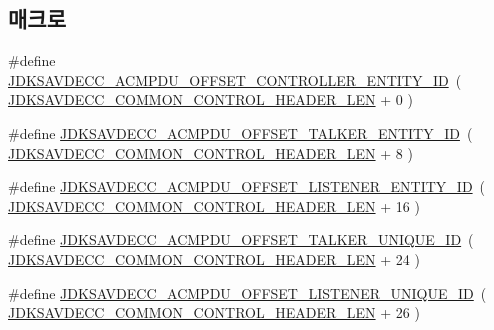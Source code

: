 \subsection*{매크로}
\begin{DoxyCompactItemize}
\item 
\#define \hyperlink{group__acmpdu_gaa909d408c6f67c983cb996f1a7bccf71}{J\+D\+K\+S\+A\+V\+D\+E\+C\+C\+\_\+\+A\+C\+M\+P\+D\+U\+\_\+\+O\+F\+F\+S\+E\+T\+\_\+\+C\+O\+N\+T\+R\+O\+L\+L\+E\+R\+\_\+\+E\+N\+T\+I\+T\+Y\+\_\+\+ID}~( \hyperlink{group__jdksavdecc__avtp__common__control__header_gaae84052886fb1bb42f3bc5f85b741dff}{J\+D\+K\+S\+A\+V\+D\+E\+C\+C\+\_\+\+C\+O\+M\+M\+O\+N\+\_\+\+C\+O\+N\+T\+R\+O\+L\+\_\+\+H\+E\+A\+D\+E\+R\+\_\+\+L\+EN} + 0 )
\item 
\#define \hyperlink{group__acmpdu_ga03909b777f940bcb1d5580824d528310}{J\+D\+K\+S\+A\+V\+D\+E\+C\+C\+\_\+\+A\+C\+M\+P\+D\+U\+\_\+\+O\+F\+F\+S\+E\+T\+\_\+\+T\+A\+L\+K\+E\+R\+\_\+\+E\+N\+T\+I\+T\+Y\+\_\+\+ID}~( \hyperlink{group__jdksavdecc__avtp__common__control__header_gaae84052886fb1bb42f3bc5f85b741dff}{J\+D\+K\+S\+A\+V\+D\+E\+C\+C\+\_\+\+C\+O\+M\+M\+O\+N\+\_\+\+C\+O\+N\+T\+R\+O\+L\+\_\+\+H\+E\+A\+D\+E\+R\+\_\+\+L\+EN} + 8 )
\item 
\#define \hyperlink{group__acmpdu_ga438673ace020114b77cb83936a2779b8}{J\+D\+K\+S\+A\+V\+D\+E\+C\+C\+\_\+\+A\+C\+M\+P\+D\+U\+\_\+\+O\+F\+F\+S\+E\+T\+\_\+\+L\+I\+S\+T\+E\+N\+E\+R\+\_\+\+E\+N\+T\+I\+T\+Y\+\_\+\+ID}~( \hyperlink{group__jdksavdecc__avtp__common__control__header_gaae84052886fb1bb42f3bc5f85b741dff}{J\+D\+K\+S\+A\+V\+D\+E\+C\+C\+\_\+\+C\+O\+M\+M\+O\+N\+\_\+\+C\+O\+N\+T\+R\+O\+L\+\_\+\+H\+E\+A\+D\+E\+R\+\_\+\+L\+EN} + 16 )
\item 
\#define \hyperlink{group__acmpdu_ga96bcaec076efc5585f8f6d68e0260336}{J\+D\+K\+S\+A\+V\+D\+E\+C\+C\+\_\+\+A\+C\+M\+P\+D\+U\+\_\+\+O\+F\+F\+S\+E\+T\+\_\+\+T\+A\+L\+K\+E\+R\+\_\+\+U\+N\+I\+Q\+U\+E\+\_\+\+ID}~( \hyperlink{group__jdksavdecc__avtp__common__control__header_gaae84052886fb1bb42f3bc5f85b741dff}{J\+D\+K\+S\+A\+V\+D\+E\+C\+C\+\_\+\+C\+O\+M\+M\+O\+N\+\_\+\+C\+O\+N\+T\+R\+O\+L\+\_\+\+H\+E\+A\+D\+E\+R\+\_\+\+L\+EN} + 24 )
\item 
\#define \hyperlink{group__acmpdu_ga95d610e339117734620bcf94935d4a8d}{J\+D\+K\+S\+A\+V\+D\+E\+C\+C\+\_\+\+A\+C\+M\+P\+D\+U\+\_\+\+O\+F\+F\+S\+E\+T\+\_\+\+L\+I\+S\+T\+E\+N\+E\+R\+\_\+\+U\+N\+I\+Q\+U\+E\+\_\+\+ID}~( \hyperlink{group__jdksavdecc__avtp__common__control__header_gaae84052886fb1bb42f3bc5f85b741dff}{J\+D\+K\+S\+A\+V\+D\+E\+C\+C\+\_\+\+C\+O\+M\+M\+O\+N\+\_\+\+C\+O\+N\+T\+R\+O\+L\+\_\+\+H\+E\+A\+D\+E\+R\+\_\+\+L\+EN} + 26 )

\end{DoxyCompactItemize}
